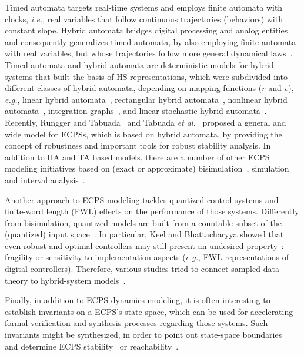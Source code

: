 \documentclass[format=acmsmall, review=false, screen=true]{acmart}
\begin{document}
Timed automata targets real-time systems and employs finite automata with clocks, {\it i.e.}, real variables that follow continuous trajectories (behaviors) with constant slope. Hybrid automata bridges digital processing and analog entities and consequently generalizes timed automata, by also employing finite automata with real variables, but whose trajectories follow more general dynamical laws~\cite{Henzinger95}.  Timed automata and hybrid automata are deterministic models for hybrid systems that built the basis of HS representations, which were subdivided into different classes of hybrid automata, depending on mapping functions ($r$ and $v$), {\it e.g.}, linear hybrid automata~\cite{Lafferriere99}, rectangular hybrid automata~\cite{Puri94,Henzinger95}, nonlinear hybrid automata~\cite{Henzinger95NL,Broucke1997}, integration graphs~\cite{Kesten1993}, and linear stochastic hybrid automata~\cite{Julius09}. Recently, Rungger and Tabuada~\cite{Rungger16} and Tabuada {\it et al.}~\cite{Tabuada14} proposed a general and wide model for ECPSs, which is based on hybrid automata, by providing the concept of robustness and important tools for robust stability analysis. In addition to HA and TA based models, there are a number of other ECPS modeling initiatives based on (exact or approximate) bisimulation~\cite{Girard11}, simulation~\cite{Rungger13} and interval analysis~\cite{Li16}.



Another approach to ECPS modeling tackles quantized control systems and finite-word length (FWL) effects on the performance of those systems. Differently from bisimulation, quantized models are built from a countable subset of the (quantized) input space~\cite{Tabuada07}. In particular, Keel and Bhattacharyya showed that even robust and optimal controllers may still present an undesired property~\cite{Keel01,bhattacharyya}: fragility or sensitivity to implementation aspects ({\it e.g.}, FWL representations of digital controllers). Therefore, various studies tried to connect sampled-data theory to hybrid-system models~\cite{Bicchi02,Petreczky10,Petreczky07,Ye98}.

Finally, in addition to ECPS-dynamics modeling, it is often interesting to establish invariants on a ECPS's state space, which can be used for accelerating formal verification and synthesis processes regarding those systems. Such invariants might be synthesized, in order to point out state-space boundaries~\cite{BenSassi12} and determine ECPS stability~\cite{Paul14} or reachability~\cite{Li16_2,Li16}.
\end{document}
